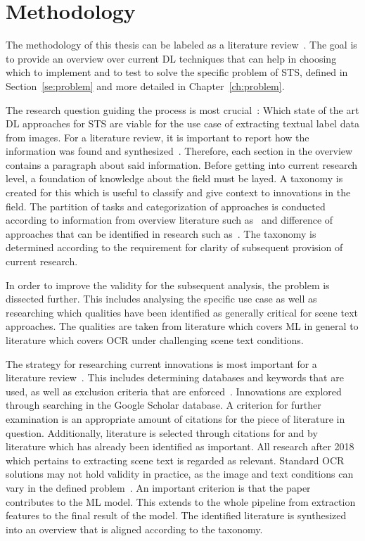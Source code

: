 \section{Methodology}\label{se:methodology}
The methodology of this thesis can be labeled as a literature review~\citep{snyder_literature_2019,
torraco_writing_2005}.
The goal is to provide an overview over current \ac{DL} techniques that can help in
choosing which to implement and to test to solve the specific problem of \ac{STS}, defined in
Section~\ref{se:problem} and more detailed in Chapter~\ref{ch:problem}.

The research question guiding the process is most crucial~\citep{snyder_literature_2019}:
Which state of the art \ac{DL} approaches for \ac{STS} are viable for the use case of extracting
textual label data from images.
For a literature review, it is important to report how the information was found and
synthesized~\citep{torraco_writing_2005}.
Therefore, each section in the overview contains a paragraph about said information.
Before getting into current research level, a foundation of knowledge about the field must be layed.
A taxonomy is created for this which is useful to classify and give context to innovations in the
field.
The partition of tasks and categorization of approaches is conducted according to information from
overview literature such as~\cite{long_scene_2021,chen_text_2021,cong_comparative_2019} and
difference of approaches that can be identified in research such
as~\cite{qiao_text_2021,sheng_centripetaltext_2021,liu_accurate_2020,deng_pixellink_2018}.
The taxonomy is determined according to the requirement for clarity of subsequent provision of
current research.

In order to improve the validity for the subsequent analysis, the problem is dissected further.
This includes analysing the specific use case as well as researching which qualities have been
identified as generally critical for scene text approaches.
The qualities are taken from literature which covers \ac{ML} in general to literature
which covers \ac{OCR} under challenging scene text conditions.

The strategy for researching current innovations is most important for a literature
review~\citep{snyder_literature_2019}.
This includes determining databases and keywords that are used, as well as exclusion criteria
that are enforced~\citep{torraco_writing_2005}.
Innovations are explored through searching in the Google Scholar database.
A criterion for further examination is an appropriate amount of citations for the piece of literature
in question.
Additionally, literature is selected through citations for and by literature which has already been
identified as important.
All research after 2018 which pertains to extracting scene text is regarded as relevant.
Standard \ac{OCR} solutions may not hold validity in practice, as the image and text conditions can
vary in the defined problem~\citep{chen_text_2021}.
An important criterion is that the paper contributes to the \ac{ML} model.
This extends to the whole pipeline from extraction features to the final result of the model.
The identified literature is synthesized into an overview that is aligned according to the taxonomy.

